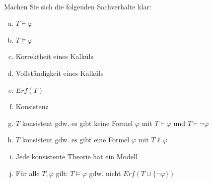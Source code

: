 

\\
Machen Sie sich die folgenden Sachverhalte klar:
\begin{enumerate}[a)]
  \item $T\vdash \varphi$
  \item $T\models \varphi$
  \item Korrektheit eines Kalküls
  \item Vollständigkeit eines Kalküls
  \item $Erf(T)$
  \item Konsistenz
  \item $T$ konsistent gdw. es gibt keine Formel $\varphi$ mit $T\vdash \varphi$ und $T\vdash \neg\varphi$
  \item $T$ konsistent gdw. es gibt eine Formel $\varphi$ mit $T\nvdash \varphi$
  \item Jede konsistente Theorie hat ein Modell
  \item Für alle $T,\varphi$ gilt: $T\models \varphi$ gdw. nicht $Erf(T\cup\{\neg\varphi\})$
\end{enumerate}


